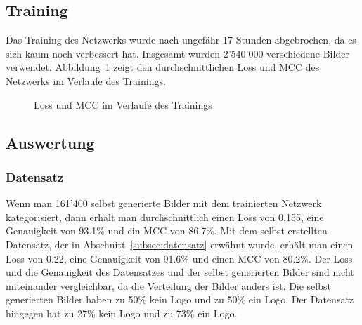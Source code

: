 \documentclass[12pt,a4paper]{report}
\begin{document}
\subsection{Training}
Das Training des Netzwerks wurde nach ungefähr 17 Stunden abgebrochen, da es sich kaum noch verbessert hat.
Insgesamt wurden 2'540'000 verschiedene Bilder verwendet.
Abbildung~\ref{fig:loss1} zeigt den durchschnittlichen Loss und MCC
des Netzwerks im Verlaufe des Trainings.
\begin{figure}[h]%
    \centering
    \qquad
    \caption{Loss und MCC im Verlaufe des Trainings}%
    \label{fig:loss1}%
\end{figure}
\subsection{Auswertung}
\subsubsection{Datensatz}
Wenn man 161'400 selbst generierte Bilder mit dem trainierten Netzwerk kategorisiert, dann erhält man durchschnittlich einen Loss von 0.155,
eine Genauigkeit von 93.1\% und ein MCC von 86.7\%.
Mit dem selbst erstellten Datensatz, der in Abschnitt~\ref{subsec:datensatz} erwähnt wurde,
erhält man einen Loss von 0.22, eine Genauigkeit von 91.6\% und einen MCC von 80.2\%.
Der Loss und die Genauigkeit des Datensatzes und der selbst generierten Bilder sind nicht miteinander vergleichbar,
da die Verteilung der Bilder anders ist.
Die selbst generierten Bilder haben zu 50\% kein Logo und zu 50\% ein Logo.
Der Datensatz hingegen hat zu 27\% kein Logo und zu 73\% ein Logo.
\end{document}
